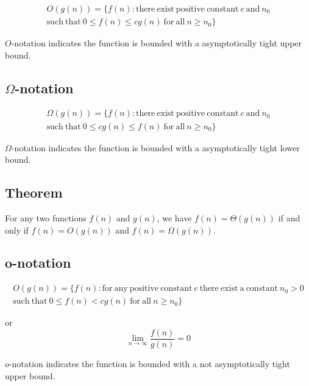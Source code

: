 \begin{gather*}
  O(g(n)) = \{ f(n): \mathrm{there\ exist\ positive\ constant\ } c\ \mathrm{and} \ n_0 \\
  \mathrm{such\ that\ } 0\le f(n) \le c g(n) \mathrm{\ for\ all\ } n\ge n_0 \}
\end{gather*}

$O$-notation indicates the function is bounded with a asymptotically tight upper bound.

\subsection{$\Omega$-notation}


\begin{gather*}
  \Omega(g(n)) = \{ f(n): \mathrm{there\ exist\ positive\ constant\ } c\ \mathrm{and} \ n_0 \\
  \mathrm{such\ that\ } 0 \le c g(n) \le f(n) \mathrm{\ for\ all\ } n\ge n_0 \}
\end{gather*}


$\Omega$-notation indicates the function is bounded with a asymptotically tight lower bound.



\subsection{Theorem}

For any two functions $f(n)$ and $g(n)$,
we have $f(n) = \Theta(g(n))$ if and only if
$f(n) = O(g(n))$ and $f(n) = \Omega(g(n))$.


\subsection{o-notation}

\begin{gather*}
  O(g(n)) = \{ f(n): \mathrm{for\ any\ positive\ constant\ } c\ \mathrm{there\ exist\ a\ constant\ } n_0 > 0 \\
  \mathrm{such\ that\ } 0\le f(n) < c g(n) \mathrm{\ for\ all\ } n\ge n_0 \}
\end{gather*}

or
\begin{equation*}
  \lim_{n\rightarrow\infty}\frac{f(n)}{g(n)} = 0
\end{equation*}

$o$-notation indicates the function is bounded with a not asymptotically tight upper bound.


